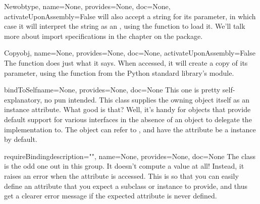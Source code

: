 \begin{verbatim%
}
\begin{verbatim%
}
\begin{verbatim%
}
\begin{verbatim%
}
\begin{verbatim%
}
\begin{verbatim%
}
\begin{verbatim%
}
\begin{verbatim%
}
\begin{verbatim%
}
\begin{funcdesc}{New}{obtype, name=None, provides=None, doc=None,
activateUponAssembly=False}
 will also accept a string for its  parameter,
in which case it will interpret the string as an ,
using the  function to load it.  We'll
talk more about import specifications in the chapter on the
 package.
\end{funcdesc}

\begin{funcdesc}{Copy}{obj, name=None, provides=None, doc=None, activateUponAssembly=False}
The  function does just what it says.  When accessed, it
will create a copy of its  parameter, using the 
function from the Python standard library's  module.
\end{funcdesc}









\begin{funcdesc}{bindToSelf}{name=None, provides=None, doc=None}
This one is pretty self-explanatory, no pun intended.  This class supplies
the owning object itself as an instance attribute.  What good is that?  Well,
it's handy for objects that provide default support for various interfaces
in the absence of an object to delegate the implementation to.  The object
can refer to , and have the
 attribute be a 
instance by default.
\end{funcdesc}

\begin{funcdesc}{requireBinding}{description="", name=None, provides=None,
doc=None}
The  class is the odd one out in this group.
It doesn't compute a value at all!  Instead, it raises an error when the
attribute is accessed.  This is so that you can easily define an attribute that
you expect a subclass or instance to provide, and thus get a clearer error
message if the expected attribute is never defined.
\end{funcdesc}


\newpage





















\end{verbatim%
}
\end{verbatim%
}
\end{verbatim%
}
\end{verbatim%
}
\end{verbatim%
}
\end{verbatim%
}
\end{verbatim%
}
\end{verbatim%
}
\end{verbatim%
}
